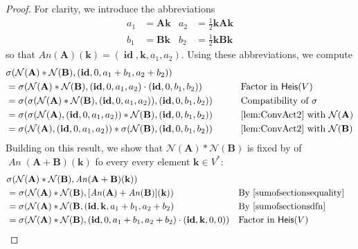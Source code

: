 \documentclass[12pt]{article}
\theoremstyle{definition}
\theoremstyle{plain}
\newcommand{\id}{\mathop{\mathbf{id}}\nolimits}
\newcommand{\An}{\mathop{\mathit{An}}}
\begin{document}
\begin{proof}
    For clarity, we introduce the abbreviations
    \begin{align}
        a_1 &= \mathbf{Ak} &
        a_2 &= \tfrac{1}{2} \mathbf{kAk} \\
        b_1 &= \mathbf{Bk} &
        b_2 &= \tfrac{1}{2} \mathbf{kBk}
    \end{align}
    so that \(\mathit{An}(\mathbf{A})(\mathbf{k}) = (\id, \mathbf{k}, a_1, a_2)\).  Using these abbreviations, we compute
    \begin{alignat}{3}\label{eq:assumption5}
        &\sigma (\mathcal{N}(\mathbf{A}) * \mathcal{N}(\mathbf{B}), (\id, 0, a_1 + b_1, a_2 + b_2)) &&\\
        &= \sigma (\mathcal{N}(\mathbf{A}) * \mathcal{N}(\mathbf{B}), (\id, 0, a_1, a_2) \cdot (\id, 0, b_1, b_2)) &&\text{Factor in }\mathsf{Heis}(V) \\
        &= \sigma (\sigma (\mathcal{N}(\mathbf{A}) * \mathcal{N}(\mathbf{B}), (\id, 0, a_1, a_2)), (\id, 0, b_1, b_2)) \qquad&&\text{Compatibility of }\sigma \\
        &= \sigma (\sigma (\mathcal{N}(\mathbf{A}), (\id, 0, a_1, a_2)) * \mathcal{N}(\mathbf{B}), (\id, 0, b_1, b_2)) \qquad &&\text{\autoref{lem:ConvAct2} with }\mathcal{N}(\mathbf{A}) \\
        &= \sigma (\mathcal{N}(\mathbf{A}), (\id, 0, a_1, a_2)) * \sigma (\mathcal{N}(\mathbf{B}), (\id, 0, b_1, b_2)) &&\text{\autoref{lem:ConvAct2} with }\mathcal{N}(\mathbf{B})
    \end{alignat}
    Building on this result, we show that \(\mathcal{N}(\mathbf{A}) * \mathcal{N}(\mathbf{B})\) is fixed by of \(\An(\mathbf{A} + \mathbf{B})(\mathbf{k})\) fo every every element \(\mathbf{k} \in V^*\):
    \begin{alignat}{3}
        &\sigma (\mathcal{N}(\mathbf{A}) * \mathcal{N}(\mathbf{B}), \An (\mathbf{A} + \mathbf{B})(\mathbf{k})) \\
        &= \sigma (\mathcal{N}(\mathbf{A}) * \mathcal{N}(\mathbf{B}), [\An (\mathbf{A}) + \mathit{An} (\mathbf{B})](\mathbf{k})) &&\text{By \autoref{sumofsectionsequality}}\\
        &= \sigma (\mathcal{N}(\mathbf{A}) * \mathcal{N}(\mathbf{B} , \left( \id, \mathbf{k}, a_1 + b_1, a_2 + b_2 \right) && \text{By \autoref{sumofsectionsdfn}}  \\
        &= \sigma (\mathcal{N}(\mathbf{A}) * \mathcal{N}(\mathbf{B}), \left( \id, 0, a_1 + b_1, a_2 + b_2 \right) \cdot (\id, \mathbf{k}, 0, 0)) &&\text{Factor in }\mathsf{Heis}(V) \\

\end{alignat}
\end{proof}
\end{document}
